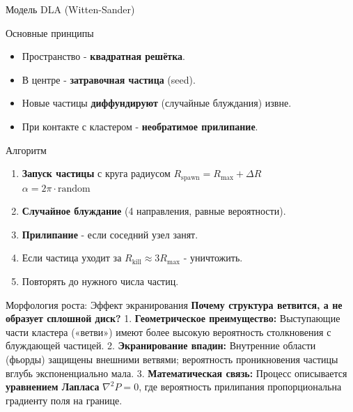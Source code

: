\documentclass[
  ignorenonframetext,
  aspectratio=169,
  russian,
]{beamer}
\providecommand{\tightlist}{%
  \setlength{\itemsep}{0pt}\setlength{\parskip}{0pt}}
\begin{document}
\begin{frame}{Модель DLA (Witten-Sander)}
\label{ux43cux43eux434ux435ux43bux44c-dla-witten-sander}
\begin{block}{Основные принципы}
\label{ux43eux441ux43dux43eux432ux43dux44bux435-ux43fux440ux438ux43dux446ux438ux43fux44b}
\begin{itemize}[<+->]
\tightlist
\item
  Пространство - \textbf{квадратная решётка}.
\item
  В центре - \textbf{затравочная частица} (seed).
\item
  Новые частицы \textbf{диффундируют} (случайные блуждания) извне.
\item
  При контакте с кластером - \textbf{необратимое прилипание}.
\end{itemize}
\end{block}

\begin{block}{Алгоритм}
\label{ux430ux43bux433ux43eux440ux438ux442ux43c}
\begin{enumerate}[<+->]
\tightlist
\item
  \textbf{Запуск частицы} с круга радиусом
  \(R_{\text{spawn}} = R_{\max} + \Delta R\)\\
  \(\alpha = 2\pi \cdot \text{random}\)
\item
  \textbf{Случайное блуждание} (4 направления, равные вероятности).
\item
  \textbf{Прилипание} - если соседний узел занят.
\item
  Если частица уходит за \(R_{\text{kill}} \approx 3R_{\max}\) -
  уничтожить.
\item
  Повторять до нужного числа частиц.
\end{enumerate}
\end{block}
\end{frame}

\begin{frame}{Морфология роста: Эффект экранирования}
\label{ux43cux43eux440ux444ux43eux43bux43eux433ux438ux44f-ux440ux43eux441ux442ux430-ux44dux444ux444ux435ux43aux442-ux44dux43aux440ux430ux43dux438ux440ux43eux432ux430ux43dux438ux44f}
\textbf{Почему структура ветвится, а не образует сплошной диск?} 1.
\textbf{Геометрическое преимущество:} Выступающие части кластера
(«ветви») имеют более высокую вероятность столкновения с блуждающей
частицей. 2. \textbf{Экранирование впадин:} Внутренние области (фьорды)
защищены внешними ветвями; вероятность проникновения частицы вглубь
экспоненциально мала. 3. \textbf{Математическая связь:} Процесс
описывается \textbf{уравнением Лапласа} \(\nabla^2 P = 0\), где
вероятность прилипания пропорциональна градиенту поля на границе.
\end{frame}
\end{document}
